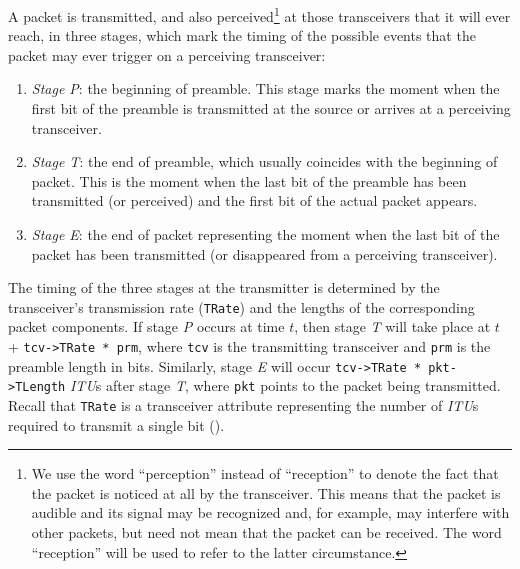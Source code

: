 A packet is transmitted, and also perceived\footnote{We use the word
``perception'' instead of ``reception'' to denote the fact that the packet
is noticed at all by the transceiver.
This means that the packet is audible and its signal
may be recognized and, for example, may interfere with other packets,
but need not mean that the packet can be received.
The word ``reception'' will be used to refer to the latter circumstance.}
at those transceivers that it will
ever reach, in three stages, which mark the timing of the possible events
that the packet may ever trigger on a perceiving transceiver:
\begin{enumerate}
\item
{\em Stage P\/}: the beginning of preamble.
This stage marks the moment when the first bit of the
preamble is transmitted at the source or arrives at a perceiving
transceiver.
\item
{\em Stage T\/}:
the end of preamble, which usually coincides with the beginning of packet.
This is the moment when the last bit of the preamble has been transmitted (or
perceived) and the first bit of the actual packet appears.
\item
{\em Stage E\/}:
the end of packet representing the moment when the last bit of the
packet has been transmitted (or disappeared from a perceiving transceiver).
\end{enumerate}

\noindent
The timing of the three stages at the transmitter is
determined by the transceiver's transmission rate ({\tt TRate}) and the lengths
of the corresponding packet components.
If stage {\em P\/} occurs at time $t$, then stage {\em T\/} will take place
at $t$ + {\tt tcv->TRate * prm}, where {\tt tcv} is the transmitting
transceiver and {\tt prm} is the preamble length in bits.
Similarly, stage {\em E\/} will occur 
{\tt tcv->TRate * pkt->TLength} {\em ITU\/}s after stage {\em T}, where
{\tt pkt} points to the packet being transmitted.
Recall that {\tt TRate} is a transceiver attribute representing the number of
{\em ITU\/}s required to transmit a single bit ().

